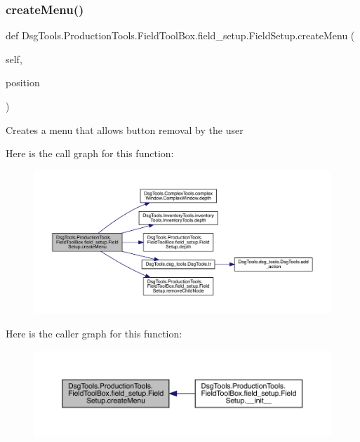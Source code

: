 \subsubsection{\texorpdfstring{create\+Menu()}{createMenu()}}
{\footnotesize\ttfamily def Dsg\+Tools.\+Production\+Tools.\+Field\+Tool\+Box.\+field\+\_\+setup.\+Field\+Setup.\+create\+Menu (\begin{DoxyParamCaption}\item[{}]{self,  }\item[{}]{position }\end{DoxyParamCaption})}

\begin{DoxyVerb}Creates a menu that allows button removal by the user
\end{DoxyVerb}
 Here is the call graph for this function\+:
\nopagebreak
\begin{figure}[H]
\begin{center}
\leavevmode
\includegraphics[width=350pt]{class_dsg_tools_1_1_production_tools_1_1_field_tool_box_1_1field__setup_1_1_field_setup_aa31edcd4f7d88997322483f4a9e53e5a_cgraph}
\end{center}
\end{figure}
Here is the caller graph for this function\+:
\nopagebreak
\begin{figure}[H]
\begin{center}
\leavevmode
\includegraphics[width=350pt]{class_dsg_tools_1_1_production_tools_1_1_field_tool_box_1_1field__setup_1_1_field_setup_aa31edcd4f7d88997322483f4a9e53e5a_icgraph}
\end{center}
\end{figure}
\mbox{\label{class_dsg_tools_1_1_production_tools_1_1_field_tool_box_1_1field__setup_1_1_field_setup_aee4760d72fd7cb7642f05ca025a54336}} 

